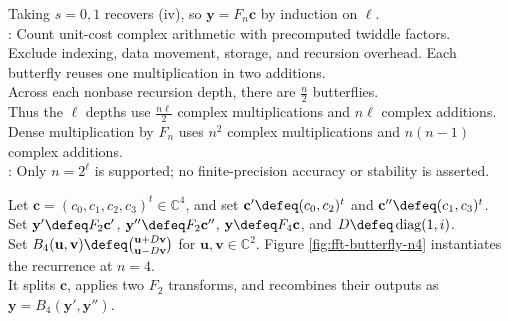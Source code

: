 \begin{computationmethod}
Taking $s=0,1$ recovers (iv), so $\mathbf{y}=F_n\mathbf{c}$ by induction on $\ell$.\\
: Count unit-cost complex arithmetic with precomputed twiddle factors.\\
Exclude indexing, data movement, storage, and recursion overhead. Each butterfly reuses one multiplication in two additions.\\
Across each nonbase recursion depth, there are $\frac{n}{2}$ butterflies.\\
Thus the $\ell$ depths use $\frac{n\ell}{2}$ complex multiplications and $n\ell$ complex additions.\\
Dense multiplication by $F_n$ uses $n^2$ complex multiplications and $n(n-1)$ complex additions.\\
: Only $n=2^\ell$ is supported; no finite-precision accuracy or stability is asserted.
\end{computationmethod}

Let $\mathbf{c}=(c_0,c_1,c_2,c_3)^t\in\mathbb{C}^4$, and set $\mathbf{c}'\defeq(c_0,c_2)^t$ and $\mathbf{c}''\defeq(c_1,c_3)^t$. Set $\mathbf{y}'\defeq F_2\mathbf{c}'$, $\mathbf{y}''\defeq F_2\mathbf{c}''$, $\mathbf{y}\defeq F_4\mathbf{c}$, and $D\defeq\operatorname{diag}(1,i)$.\\
Set $B_4(\mathbf{u},\mathbf{v})\defeq\binom{\mathbf{u}+D\mathbf{v}}{\mathbf{u}-D\mathbf{v}}$ for $\mathbf{u},\mathbf{v}\in\mathbb{C}^2$. Figure \ref{fig:fft-butterfly-n4} instantiates the recurrence at $n=4$.\\
It splits $\mathbf{c}$, applies two $F_2$ transforms, and recombines their outputs as $\mathbf{y}=B_4(\mathbf{y}',\mathbf{y}'')$.

\begin{illustrationfigure}[H]
  
  \caption{The $n=4$ radix-two split: two $F_2$ transforms feed the butterfly $B_4$ and produce $F_4\mathbf{c}$.}
  \label{fig:fft-butterfly-n4}
\end{illustrationfigure}
